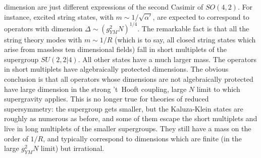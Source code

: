 \begin{itemize}
dimension are just different expressions of the second
Casimir of $SO(4,2)$.  For
instance, excited string states, with $m \sim 1/\sqrt{\alpha'}$, are
expected to correspond to operators with dimension $\Delta \sim (g_{YM}^2
N)^{1/4}$.  The remarkable fact is that all the string theory modes with $m
\sim 1/R$ (which is to say, all closed string states which arise from
 massless ten dimensional fields) fall in
short multiplets of the supergroup $SU(2,2|4)$.  All other states have
a much
larger mass.  The operators in short multiplets have algebraically
protected dimensions.  The obvious conclusion is that all operators whose
dimensions are not algebraically protected have large dimension
in the strong 't~Hooft coupling, large $N$ limit to which supergravity
applies.  This is no longer true for theories of reduced supersymmetry: the
supergroup gets smaller, but the Kaluza-Klein states are roughly as
numerous as before, and some of them escape the short multiplets and
live in long multiplets of the smaller supergroups.  They
still have a mass on the order of $1/R$, and typically correspond to dimensions
which are finite (in the large $g_{YM}^2 N$ limit) but irrational.
  \end{itemize}

